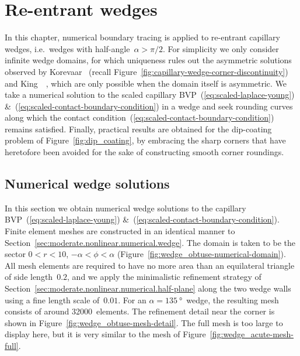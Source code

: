 \chapter{Re-entrant wedges}
\label{ch:re-entrant}

In this chapter,
numerical boundary tracing is applied to re-entrant capillary wedges,
i.e.~wedges with half-angle~$\alpha > \pi/2$.
For simplicity we only consider infinite wedge domains,
for which uniqueness rules out the asymmetric solutions observed by
Korevaar~\cite{korevaar-1980-capillary-re-entrant-corner}
(recall Figure~\ref{fig:capillary-wedge-corner-discontinuity})
and King~\etal~\cite{king-1999-laplace-young-near-corner},
which are only possible when the domain itself is asymmetric.
We take a numerical solution to
the scaled capillary BVP~(\ref{eq:scaled-laplace-young})
\&~(\ref{eq:scaled-contact-boundary-condition})
in a wedge
and seek rounding curves along which
the contact condition~(\ref{eq:scaled-contact-boundary-condition})
remains satisfied.
Finally, practical results are obtained for the dip-coating problem
of Figure~\ref{fig:dip_coating},
by embracing the sharp corners
that have heretofore been avoided
for the sake of constructing smooth corner roundings.

\section{Numerical wedge solutions}
\label{sec:re-entrant.numerical}

In this section we obtain numerical wedge solutions
to the capillary BVP~(\ref{eq:scaled-laplace-young})
\&~(\ref{eq:scaled-contact-boundary-condition}).
Finite element meshes are constructed in an identical manner
to Section~\ref{sec:moderate.nonlinear.numerical.wedge}.
The domain is taken to be the sector $0 < r < 10$, $-\alpha < \phi < \alpha$
(Figure~\ref{fig:wedge_obtuse-numerical-domain}).
All mesh elements are required to have no more area
than an equilateral triangle of side length~$0.2$,
and we apply the minimalistic refinement strategy
of Section~\ref{sec:moderate.nonlinear.numerical.half-plane}
along the two wedge walls
using a fine length scale of~$0.01$.
For an $\alpha = \SI{135}{\degree}$~wedge,
the resulting mesh consists of around 32000~elements.
The refinement detail near the corner
is shown in Figure~\ref{fig:wedge_obtuse-mesh-detail}.
The full mesh is too large to display here,
but it is very similar to the mesh of Figure~\ref{fig:wedge_acute-mesh-full}.

\begin{figure}
  \begin{minipage}[t]{0.48\textwidth}
  \end{minipage}
  \hfill
  \begin{minipage}[t]{0.48\textwidth}
  \end{minipage}
\end{figure}


